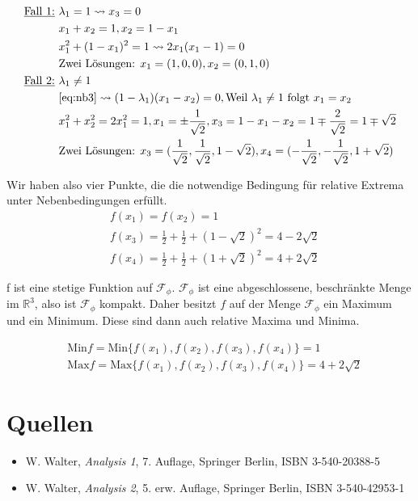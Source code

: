 \begin{align*}
    \text{\underline{Fall 1:} } & \lambda_1 = 1 \leadsto x_3 = 0 \\
        & x_1 + x_2 = 1, x_2 = 1-x_1 \\
        & x_1^2 + (1-x_1)^2 = 1 \leadsto 2x_1(x_1 - 1) = 0 \\
        & \text{Zwei Lösungen: } x_1 = (1, 0, 0), x_2 = (0, 1, 0) \\
    \text{\underline{Fall 2:} } & \lambda_1 \neq 1 \\
        & \eqref{eq:nb3} \leadsto (1-\lambda_1)(x_1-x_2) = 0, \text{Weil $\lambda_1\neq1$ folgt $x_1 = x_2$} \\
        & x_1^2 + x_2^2 = 2x_1^2 = 1, x_1 = \pm\frac{1}{\sqrt{2}}, x_3 = 1-x_1-x_2 = 1\mp\frac{2}{\sqrt{2}} = 1\mp\sqrt{2} \\
        & \text{Zwei Lösungen: } x_3 = (\frac{1}{\sqrt{2}}, \frac{1}{\sqrt{2}}, 1-\sqrt{2}),
            x_4 = (-\frac{1}{\sqrt{2}}, -\frac{1}{\sqrt{2}}, 1+\sqrt{2}) \\
\end{align*}

Wir haben also vier Punkte, die die notwendige Bedingung für relative Extrema unter Nebenbedingungen erfüllt.
\begin{align*}
    & f(x_1) = f(x_2) = 1 \\
    & f(x_3) = \frac{1}{2} + \frac{1}{2} + (1 - \sqrt{2})^2 = 4 - 2\sqrt{2} \\
    & f(x_4) = \frac{1}{2} + \frac{1}{2} + (1 + \sqrt{2})^2 = 4 + 2\sqrt{2}
\end{align*}

f ist eine stetige Funktion auf $\mathcal{F}_\phi$. $\mathcal{F}_\phi$ ist eine abgeschlossene, beschränkte Menge im $\mathbb{R}^3$,
also ist $\mathcal{F}_\phi$ kompakt. Daher besitzt $f$ auf der Menge $\mathcal{F}_\phi$ ein Maximum und ein Minimum. Diese sind dann
auch relative Maxima und Minima.

\begin{align*}
    & \text{Min}f = \text{Min} \{f(x_1), f(x_2), f(x_3), f(x_4)\} = 1 \\
    & \text{Max}f = \text{Max} \{f(x_1), f(x_2), f(x_3), f(x_4)\} = 4 + 2\sqrt{2}
\end{align*}

\section{Quellen}
\begin{itemize}
    \item W. Walter, {\it Analysis 1}, 7. Auflage, Springer Berlin, ISBN 3-540-20388-5
    \item W. Walter, {\it Analysis 2}, 5. erw. Auflage, Springer Berlin, ISBN 3-540-42953-1
\end{itemize}


